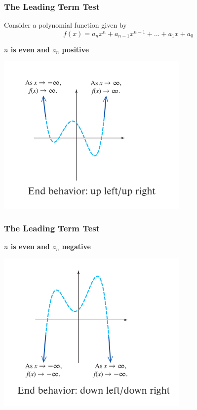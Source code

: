 \documentclass{beamer}
\begin{document}
\begin{frame}
    \frametitle{The Leading Term Test}

    Consider a polynomial function given by \[f(x)= a_n x^n + a_{n-1}x^{n-1} + \dots + a_1 x + a_0\]

    \textbf{\(n\) is even and \(a_n\) positive}

    \includegraphics[scale=0.5]{figs/fig_5.png}

\end{frame}


\begin{frame}
    \frametitle{The Leading Term Test}


    \textbf{\(n\) is even and \(a_n\) negative}

    \includegraphics[scale=0.5]{figs/fig_6.png}

\end{frame}
\end{document}
